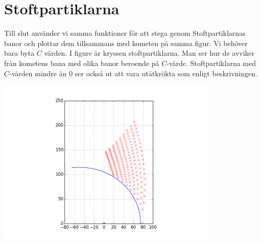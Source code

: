 \documentclass[11pt,twoside]{article}
\begin{document}
\section{Stoftpartiklarna}

Till slut använder vi samma funktioner för att stega genom Stoftpartiklarnas banor och plottar dem tillsammans med kometen på samma figur. Vi behöver bara byta $C$ värden.
I figure är kryssen stoftpartiklarna. Man ser hur de avviker från kometens bana med olika banor beroende på $C$-värde. Stoftpartiklarna med $C$-värden mindre än 0 ser också
ut att vara utåtkrökta som enligt beskrivningen.

\includegraphics[width=300pt]{imgs/svans.png}
\end{document}
